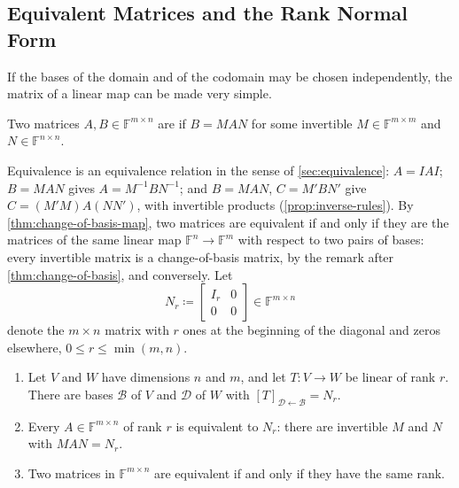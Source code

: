 \subsection{Equivalent Matrices and the Rank Normal Form}

If the bases of the domain and of the codomain may be chosen independently, the matrix of a linear map can be made very simple.

\begin{definition}
\label{def:equivalent-matrices}
Two matrices $A,B\in\mathbb F^{m\times n}$ are  if $B=MAN$ for some invertible $M\in\mathbb F^{m\times m}$ and $N\in\mathbb F^{n\times n}$.
\end{definition}

Equivalence is an equivalence relation in the sense of \cref{sec:equivalence}: $A=IAI$; $B=MAN$ gives $A=M^{-1}BN^{-1}$; and $B=MAN$, $C=M'BN'$ give $C=(M'M)A(NN')$, with invertible products (\cref{prop:inverse-rules}). By \cref{thm:change-of-basis-map}, two matrices are equivalent if and only if they are the matrices of the same linear map $\mathbb F^n\to\mathbb F^m$ with respect to two pairs of bases: every invertible matrix is a change-of-basis matrix, by the remark after \cref{thm:change-of-basis}, and conversely. Let
\[
N_r\coloneqq\begin{bmatrix}I_r&0\\0&0\end{bmatrix}\in\mathbb F^{m\times n}
\]
denote the $m\times n$ matrix with $r$ ones at the beginning of the diagonal and zeros elsewhere, $0\le r\le\min(m,n)$.

\begin{theorem}
\label{thm:rank-normal-form}
\leavevmode
\begin{enumerate}
\item Let $V$ and $W$ have dimensions $n$ and $m$, and let $T\colon V\to W$ be linear of rank $r$. There are bases $\mathcal B$ of $V$ and $\mathcal D$ of $W$ with $[T]_{\mathcal D\leftarrow\mathcal B}=N_r$.
\item Every $A\in\mathbb F^{m\times n}$ of rank $r$ is equivalent to $N_r$: there are invertible $M$ and $N$ with $MAN=N_r$.
\item Two matrices in $\mathbb F^{m\times n}$ are equivalent if and only if they have the same rank.
\end{enumerate}
\end{theorem}

